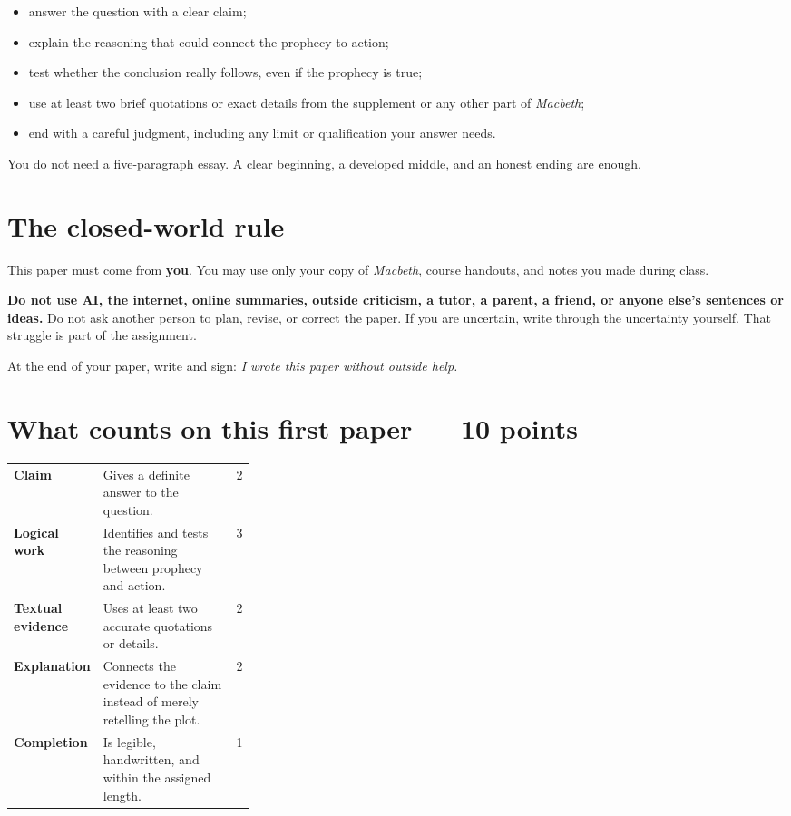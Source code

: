 \documentclass[11pt]{article}
\begin{document}
\begin{itemize}
\item answer the question with a clear claim;
\item explain the reasoning that could connect the prophecy to action;
\item test whether the conclusion really follows, even if the prophecy is true;
\item use at least two brief quotations or exact details from the supplement or any other part of \textit{Macbeth};
\item end with a careful judgment, including any limit or qualification your answer needs.
\end{itemize}

You do not need a five-paragraph essay. A clear beginning, a developed middle, and an honest ending are enough.

\section*{The closed-world rule}

This paper must come from \textbf{you}. You may use only your copy of \textit{Macbeth}, course handouts, and notes you made during class.

\textbf{Do not use AI, the internet, online summaries, outside criticism, a tutor, a parent, a friend, or anyone else's sentences or ideas.} Do not ask another person to plan, revise, or correct the paper. If you are uncertain, write through the uncertainty yourself. That struggle is part of the assignment.

At the end of your paper, write and sign: \emph{I wrote this paper without outside help.}

\section*{What counts on this first paper --- 10 points}

\begin{tabularx}{\linewidth}{>{\bfseries}p{0.31\linewidth}Xr}
Claim & Gives a definite answer to the question. & 2\\
Logical work & Identifies and tests the reasoning between prophecy and action. & 3\\
Textual evidence & Uses at least two accurate quotations or details. & 2\\
Explanation & Connects the evidence to the claim instead of merely retelling the plot. & 2\\
Completion & Is legible, handwritten, and within the assigned length. & 1\\
\end{tabularx}
\end{document}
